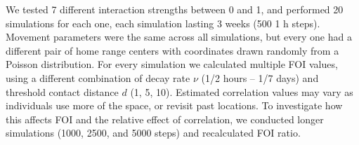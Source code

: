 \documentclass[letterpaper]{article}
\begin{document}
We tested 7 different interaction strengths between 0 and 1, and performed 20 simulations for each one, each simulation lasting 3 weeks (500 1 h steps). Movement parameters were the same across all simulations, but every one had a different pair of home range centers with coordinates drawn randomly from a Poisson distribution. For every simulation we calculated multiple FOI values, using a different combination of decay rate $\nu$ (1/2 hours -- 1/7 days) and threshold contact distance $d$ (1, 5, 10). Estimated correlation values may vary as individuals use more of the space, or revisit past locations. To investigate how this affects FOI and the relative effect of correlation, we conducted longer simulations (1000, 2500, and 5000 steps) and recalculated FOI ratio. 




\end{document}
